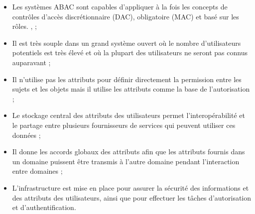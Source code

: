 \begin{itemize}
\item Les systèmes ABAC sont capables d'appliquer à la fois les concepts de contrôles d'accès discrétionnaire (DAC), obligatoire (MAC) et basé sur les rôles. \cite{fisher00}, \cite{hu20};
\item Il est très souple dans un grand système ouvert où le nombre d'utilisateurs potentiels est très élevé et où la plupart des utilisateurs ne seront pas connus auparavant \cite{aftab15};
\item Il n'utilise pas les attributs pour définir directement la permission entre les sujets et les objets mais il utilise les attributs comme la base de l'autorisation \cite{aftab15};
\item Le stockage central des attributs des utilisateurs permet l'interopérabilité et le partage entre plusieurs fournisseurs de services qui peuvent utiliser ces données \cite{aftab15};
\item Il donne les accords globaux des attributs afin que les attributs fournis dans un domaine puissent être transmis à l'autre domaine pendant l'interaction entre domaines \cite{aftab15};
\item L'infrastructure est mise en place pour assurer la sécurité des informations et des attributs des utilisateurs, ainsi que pour effectuer les tâches d'autorisation et d'authentification.
\end{itemize}

